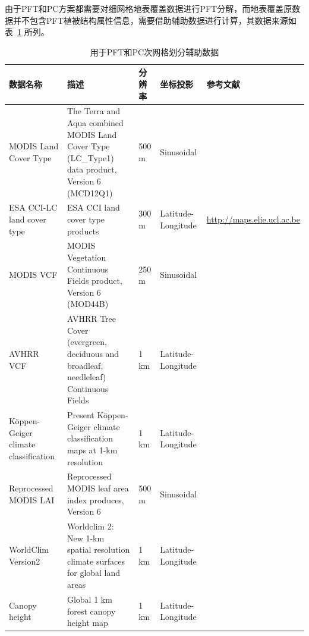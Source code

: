 由于PFT和PC方案都需要对细网格地表覆盖数据进行PFT分解，而地表覆盖原数据并不包含PFT植被结构属性信息，需要借助辅助数据进行计算，其数据来源如表~\ref{tab:网格划分辅助数据} 所列。

\begin{landscape}
\begin{table}[htbp]
\centering
\caption{用于PFT和PC次网格划分辅助数据}
\label{tab:网格划分辅助数据}

\begin{tabular}[h]{p{3cm}p{6cm}p{2cm}p{2cm}p{5cm}}
\toprule
数据名称      & 描述        & 分辨率   & 坐标投影     & 参考文献           \\ \midrule
MODIS Land Cover Type & The Terra and Aqua combined MODIS Land Cover Type (LC\_Type1) data product, Version 6 (MCD12Q1) & 500 m & Sinusoidal        & \citet{Friedl2019}                \\\midrule
ESA CCI-LC land cover type         & ESA CCI land cover type products                                                                & 300 m & Latitude-Longitude & \url{http://maps.elie.ucl.ac.be} \\\midrule
MODIS VCF      & MODIS Vegetation Continuous Fields product, Version 6 (MOD44B)                                           & 250 m    & Sinusoidal         & \citet{DiMiceli2015}                        \\\midrule
AVHRR VCF& AVHRR Tree Cover (evergreen, deciduous and broadleaf, needleleaf) Continuous Fields                      & 1 km  & Latitude-Longitude & \citet{defries2000new}                         \\\midrule
Köppen-Geiger climate classification        & Present Köppen-Geiger climate classification maps at 1-km resolution                            & 1 km  & Latitude-Longitude & \citet{beck2018}     \\\midrule
Reprocessed MODIS LAI                 & Reprocessed MODIS leaf area index produces, Version 6                                           & 500 m & Sinusoidal         & \citet{yuan2011reprocessing,lin2023ReprocessedMODISVersion}     \\\midrule
WorldClim Version2                    & Worldclim 2: New 1-km spatial resolution climate surfaces for global land areas                          & 1 km  & Latitude-Longitude & \citet{fick2017worldclim}   \\\midrule
Canopy height                         & Global 1 km forest canopy height map                                                            & 1 km  & Latitude-Longitude & \citet{simard2011mapping}             \\ \bottomrule
\end{tabular}
\end{table}
\end{landscape}

